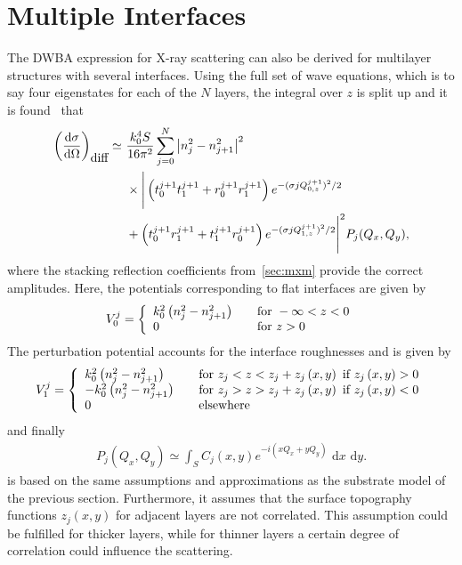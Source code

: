 \documentclass[10pt,twoside, b5paper,pdftex]{report}
\newcommand{\B}[1]{\left( #1 \right)}
\begin{document}
    





\section{Multiple Interfaces\label{sec:DWBAML}}
The DWBA expression for X-ray scattering can also be derived for multilayer structures with several interfaces. Using the full set of wave equations, which is to say four eigenstates for each of the $N$ layers, the integral over $z$ is split up and it is found~\cite{HOLY} that
\begin{align}
	\left(\frac{\mbox{d}\sigma}{\mbox{d}\Omega}\right)_{\mbox{diff}} \simeq~& \frac{k_0^4 S}{16\pi^2} \sum_{j = 0}^N \left|n_{j}^2 - n_{j+1}^2\right|^2 \notag\\
	&\times \Bigg|\B{t_{0}^{j+1}t_{1}^{j+1} + r_{0}^{j+1}r_{1}^{j+1}}e^{-(\sigma{j}Q_{0,z}^{j+1})^2/2}  \notag\\
	&+ \B{t_{0}^{j+1}r_{1}^{j+1} + t_{1}^{j+1}r_{0}^{j+1}}e^{-(\sigma{j}Q_{1,z}^{j+1})^2/2}\Bigg|^2 P_{j}(Q_{x},Q_{y}) , \label{eq:dwba_ml}
\end{align}
where the stacking reflection coefficients from~\cref{sec:mxm} provide the correct amplitudes. Here, the potentials corresponding to flat interfaces are given by 
\begin{equation}\label{eq:U0_ml}
V_{0}^j = \left\{
  \begin{array}{l l}
    k_{0}^{2}\left(n_{j}^2 - n_{j+1}^2\right) & \quad \mbox{for } -\infty < z < 0\\
    0 & \quad \mbox{for } z > 0\\
  \end{array} \right.
\end{equation}
The perturbation potential accounts for the interface roughnesses and is given by 
\begin{equation}\label{eq:U1_ml}
V_{1}^j = \left\{
  \begin{array}{l l}
    k_{0}^{2}\left(n_{j}^2 - n_{j+1}^2\right) & \quad \mbox{for } z_j < z < z_j + z_j\left(x,y\right) \mbox{ if } z_j\left(x,y\right) > 0\\
    -k_{0}^{2}\left(n_{j}^2 - n_{j+1}^2\right) & \quad \mbox{for } z_j > z > z_j + z_j\left(x,y\right) \mbox{ if } z_j\left(x,y\right) < 0\\
    0 & \quad \mbox{elsewhere}\\
  \end{array} \right.
\end{equation}
and finally
\begin{align}
	P_{j}(Q_{x},Q_{y})\simeq \int_{S} C_{j}(x,y)e^{-i(xQ_{x}+yQ_{y})} \mbox{ d}x \mbox{ d}y. \label{eq:Uxy}
\end{align}
 is based on the same assumptions and approximations as the substrate model of the previous section. Furthermore, it assumes that the surface topography functions $z_{j}(x,y)$ for adjacent layers are not correlated. This assumption could be fulfilled for thicker layers, while for thinner layers a certain degree of correlation could influence the scattering.
\end{document}
